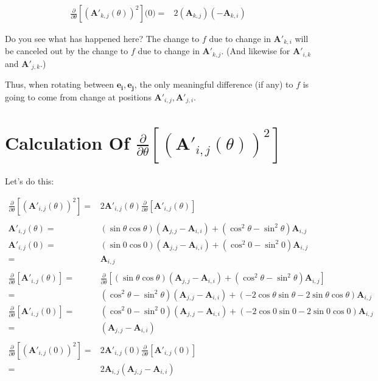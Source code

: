 \documentclass[11pt, oneside]{amsart}
\newcommand{\fpartial}[2]{\frac{\partial #1}{\partial #2}}
\newcommand{\mtx}[1]{\bm{#1}}
\renewcommand{\vec}[1]{\mathbf{#1}}
\newcommand{\bvec}[1]{\vec{e_{#1}}}
\newcommand{\fptheta}{\fpartial{}{\theta}}
\newcommand{\mtxA}{\mtx{A}}
\begin{document}
\begin{equation*}
  \begin{split}
    \fptheta \left[ \left( \mtxA'_{k, j}(\theta) \right)^2 \right] \big(0\big)
      ={}&
        2
        \left( \mtxA_{k, j} \right)
        \left( -\mtxA_{k, i} \right)
  \end{split}
\end{equation*}

Do you see what has happened here? The change to $f$ due to change in
$\mtxA'_{k, i}$ will be canceled out by the change to $f$ due to change
in $\mtxA'_{k, j}$. (And likewise for $\mtxA'_{i, k}$ and $\mtxA'_{j,
k}$.)

Thus, when rotating between $\bvec{i}, \bvec{j}$, the only meaningful
difference (if any) to $f$ is going to come from change at positions
$\mtxA'_{i, j}, \mtxA'_{j, i}$.

\section{Calculation Of $\fptheta \left[ \left( \mtxA'_{i, j}(\theta) \right)^2 \right]$}

Let's do this:

\begin{equation*}
  \begin{split}
    \fptheta \left[ \left( \mtxA'_{i, j}(\theta) \right)^2 \right]
      ={}&
        2
        \mtxA'_{i, j}(\theta)
        \fptheta \left[ \mtxA'_{i, j}(\theta) \right] \\
    \\
    \mtxA'_{i, j}(\theta)
      ={}&
        (\sin\theta\cos\theta) (\mtxA_{j, j} - \mtxA_{i, i})
        + (\cos^2\theta - \sin^2\theta) \mtxA_{i, j} \\
    \mtxA'_{i, j}(0)
      ={}&
        (\sin0 \cos0) (\mtxA_{j, j} - \mtxA_{i, i})
        + (\cos^2 0 - \sin^2 0) \mtxA_{i, j} \\
      ={}& \mtxA_{i, j} \\
    \\
    \fptheta \left[ \mtxA'_{i, j}(\theta) \right]
      ={}&
        \fptheta \left[
          (\sin\theta\cos\theta)(\mtxA_{j, j} - \mtxA_{i, i})
          + (\cos^2\theta - \sin^2\theta) \mtxA_{i, j}
        \right] \\
      ={}&
        (\cos^2\theta - \sin^2\theta) (\mtxA_{j, j} - \mtxA_{i, i})
        + (-2\cos\theta\sin\theta - 2\sin\theta\cos\theta) \mtxA_{i, j} \\
    \fptheta \left[ \mtxA'_{i, j}(0) \right]
      ={}&
        (\cos^2 0 - \sin^2 0) (\mtxA_{j, j} - \mtxA_{i, i})
        + (-2\cos 0 \sin 0 - 2\sin 0 \cos 0) \mtxA_{i, j} \\
      ={}&
        (\mtxA_{j, j} - \mtxA_{i, i}) \\
    \\
    \fptheta \left[ \left( \mtxA'_{i, j}(0) \right)^2 \right]
      ={}&
        2
        \mtxA'_{i, j}(0)
        \fptheta \left[ \mtxA'_{i, j}(0) \right] \\
      ={}&
        2
        \mtxA_{i, j}
        (\mtxA_{j, j} - \mtxA_{i, i}) \\
  \end{split}
\end{equation*}
\end{document}
